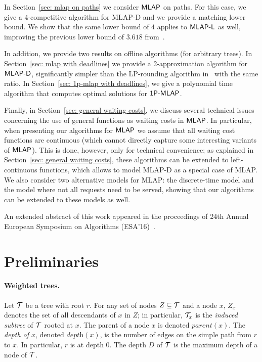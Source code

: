 \documentclass[a4paper]{article}
\newcommand{\calT}{{\cal T}}
\newcommand{\depth}{\textit{depth}}
\newcommand{\parent}{\textit{parent}}
\newcommand{\MLAP}{\mbox{\rm\textsf{MLAP}}}
\newcommand{\MLAPL}{\mbox\rm{\textsf{MLAP-L}}}
\newcommand{\MLAPD}{\mbox{\rm\textsf{MLAP-D}}}
\newcommand{\SPMLAP}{\mbox{\rm\textsf{1P-MLAP}}}
\begin{document}
In Section~\ref{sec: mlap on paths} we consider $\MLAP$ on paths.
For this case, we give a $4$-competitive algorithm for {\MLAPD} and we provide
a matching lower bound.  We show that the same lower bound of $4$ applies to 
$\MLAPL$ as well, improving the previous lower bound of $3.618$
from~\cite{aggregation_wads_2013}.

In addition, we provide two results on offline algorithms (for arbitrary trees).  
In Section~\ref{sec: mlap with deadlines} we provide a 2-approximation
algorithm for $\MLAPD$, significantly simpler than the LP-rounding
algorithm in~\cite{packet-aggregation-becchetti} with the same ratio.
In Section~\ref{sec: 1p-mlap with deadlines}, we give a polynomial
time algorithm that computes optimal solutions for $\SPMLAP$.

Finally, in Section~\ref{sec: general waiting costs}, we discuss
several technical issues concerning the use of general functions as
waiting costs in $\MLAP$. In particular, when presenting our algorithms for $\MLAP$
we assume that all waiting cost functions are continuous (which cannot directly capture some
interesting variants of $\MLAP$).
This is done, however, only for technical convenience; as explained in Section~\ref{sec: general waiting costs},
these algorithms can be extended to left-continuous
functions, which allows to model {\MLAPD} as a special case
of {\MLAP}. We also consider two alternative models for {\MLAP}: the
discrete-time model and the model where not all requests need to be
served, showing that our algorithms can be extended to these models as well.

An extended abstract of this work appeared in the proceedings of  
24th Annual European Symposium on Algorithms (ESA'16)~\cite{Bienkowski_etal_multilevel_esa_2016}.


\section{Preliminaries}
\label{sec: preliminaries}

\paragraph{Weighted trees.}

Let $\calT$ be a tree with root $r$.
For any set of nodes $Z\subseteq\calT$ and a node $x$, $Z_x$ denotes
the set of all descendants of $x$ in $Z$; in particular, $\calT_x$ is 
the \emph{induced subtree} of $\calT$ rooted at $x$.
The parent of a node $x$ is denoted $\parent(x)$.
The \emph{depth of $x$}, denoted $\depth(x)$, is
the number of edges on the simple path from $r$ to $x$. In
particular, $r$ is at depth $0$. The depth $D$ of $\calT$ is the
maximum depth of a node of $\calT$.
\end{document}
